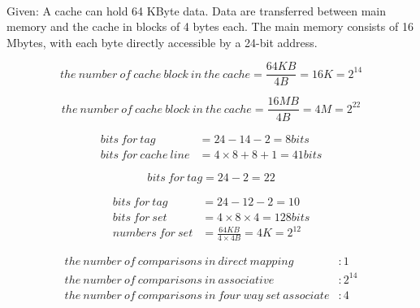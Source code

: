 \documentclass{ctexart}
\newcounter{answercnt}
\newcommand{\sCourse}{计算机系统结构}   %
\newcommand{\nTime}{4}             %
\newcommand{\sName}{黄昊}           %
\newcommand{\sNumber}{20204205}     %
\begin{document}
    \setcounter{answercnt}{0}
    \begin{center}
        \\
        \fontsize{13pt}{0}{\textit{\kaishu\sName\qquad\sNumber}}
    \end{center}


    \noindent Given:  A cache can hold 64 KByte data. Data are transferred between main memory and the cache in blocks of 4 bytes each. The main memory consists of 16 Mbytes, with each byte directly accessible by a 24-bit address.

    
    
    $$
    the\ number\ of\ cache\ block\ in\ the\ cache = \frac{64KB}{4B} = 16K = 2^{14} 
    $$


    
    

    $$
    the\ number\ of\ cache\ block\ in\ the\ cache = \frac{16MB}{4B} = 4M = 2^{22} 
    $$


    
    
    $$
    \begin{aligned}
        bits\ for\ tag &=24 - 14 - 2 = 8bits\\
        bits\ for\ cache\ line &= 4\times 8+8+1= 41bits
    \end{aligned}
    $$


    
    
    $$
        bits\ for\ tag =24 - 2 = 22
    $$


    
    
    $$
    \begin{aligned}
        bits\ for\ tag &=24 - 12 - 2 = 10\\
        bits\ for\ set &=4\times 8\times 4 = 128bits\\
        numbers\ for\ set &=\frac{64KB}{4\times 4B}=4K=2^{12}
    \end{aligned}
    $$


    
    
    $$
    \begin{aligned}
        the\ number\ of\ comparisons\ in\ direct\ mapping&:1\\
        the\ number\ of\ comparisons\ in\ associative&:2^{14}\\
        the\ number\ of\ comparisons\ in\ four\ way\ set\ associate&:4\\
    \end{aligned}
    $$
\end{document}

